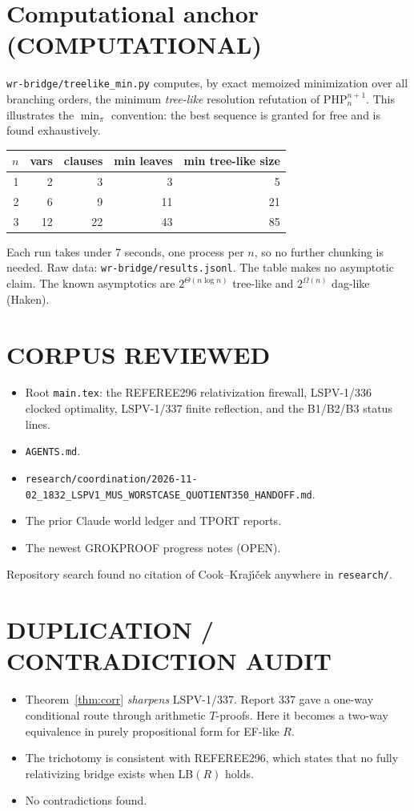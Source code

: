\documentclass[11pt]{article}
\theoremstyle{definition}\newtheorem{definition}[theorem]{Definition}\newtheorem{remark}[theorem]{Remark}
\begin{document}
\section{Computational anchor (COMPUTATIONAL)}
\texttt{wr-bridge/treelike\_min.py} computes, by exact memoized minimization over all branching orders, the minimum \emph{tree-like} resolution refutation of $\mathrm{PHP}^{n+1}_n$. This illustrates the $\min_\pi$ convention: the best sequence is granted for free and is found exhaustively.
\begin{center}\begin{tabular}{rrrrr}
$n$&vars&clauses&min leaves&min tree-like size\\\hline
1&2&3&3&5\\2&6&9&11&21\\3&12&22&43&85
\end{tabular}\end{center}
Each run takes under 7 seconds, one process per $n$, so no further chunking is needed. Raw data: \texttt{wr-bridge/results.jsonl}. The table makes no asymptotic claim. The known asymptotics are $2^{\Theta(n\log n)}$ tree-like and $2^{\Omega(n)}$ dag-like (Haken).

\section*{CORPUS REVIEWED}
\begin{itemize}
\item Root \texttt{main.tex}: the REFEREE296 relativization firewall, LSPV-1/336 clocked optimality, LSPV-1/337 finite reflection, and the B1/B2/B3 status lines.
\item \texttt{AGENTS.md}.
\item \texttt{research/coordination/2026-11-02\_1832\_LSPV1\_MUS\_WORSTCASE\_QUOTIENT350\_HANDOFF.md}.
\item The prior Claude world ledger and TPORT reports.
\item The newest GROKPROOF progress notes (OPEN).
\end{itemize}
Repository search found no citation of Cook--Kraj\'{\i}\v{c}ek anywhere in \texttt{research/}.

\section*{DUPLICATION / CONTRADICTION AUDIT}
\begin{itemize}
\item Theorem~\ref{thm:corr} \emph{sharpens} LSPV-1/337. Report 337 gave a one-way conditional route through arithmetic $T$-proofs. Here it becomes a two-way equivalence in purely propositional form for EF-like $R$.
\item The trichotomy is consistent with REFEREE296, which states that no fully relativizing bridge exists when LB$(R)$ holds.
\item No contradictions found.
\end{itemize}
\end{document}
